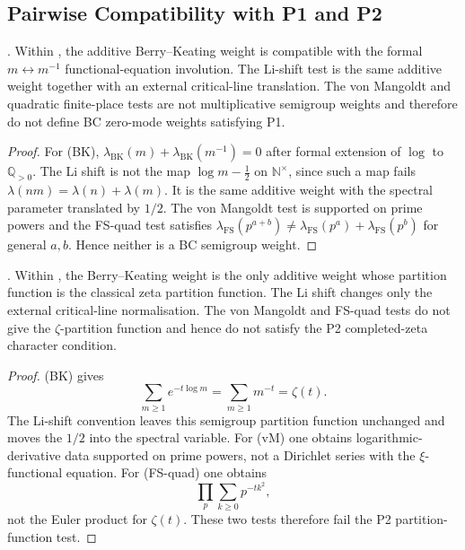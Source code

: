 \subsection{Pairwise Compatibility with P1 and P2}
\label{v4-arith:hpar-det:compat-P1-P2}

\begin{lemma}
\label{v4-arith:hpar-det:lem:P1-compat}
\ClaimStatusProvedHere. Within
, the additive
Berry--Keating weight is compatible with the formal
\(m\leftrightarrow m^{-1}\) functional-equation involution. The
Li-shift test is the same additive weight together with an external
critical-line translation. The von Mangoldt and quadratic finite-place
tests are not multiplicative semigroup weights and therefore do
not define BC zero-mode weights satisfying P1.
\end{lemma}

\begin{proof}
For (BK),
\(\lambda_{\mathrm{BK}}(m)+\lambda_{\mathrm{BK}}(m^{-1})=0\) after
formal extension of \(\log\) to \(\mathbb{Q}_{>0}\). The Li shift is not the map
\(\log m-\frac12\) on \(\mathbb{N}^{\times}\), since such a map fails
\(\lambda(nm)=\lambda(n)+\lambda(m)\). It is the same additive weight
with the spectral parameter translated by \(1/2\). The von Mangoldt
test is supported on prime powers and the FS-quad test satisfies
\(\lambda_{\mathrm{FS}}(p^{a+b})\ne
\lambda_{\mathrm{FS}}(p^{a})+\lambda_{\mathrm{FS}}(p^{b})\) for
general \(a,b\). Hence neither is a BC semigroup weight.
\end{proof}

\begin{lemma}
\label{v4-arith:hpar-det:lem:P2-compat}
\ClaimStatusProvedHere. Within
, the Berry--Keating
weight is the only additive weight whose partition function is the
classical zeta partition function. The Li shift changes only the
external critical-line normalisation. The von Mangoldt and FS-quad
tests do not give the \(\zeta\)-partition function and hence do not
satisfy the P2 completed-zeta character condition.
\end{lemma}

\begin{proof}
(BK) gives
\[
 \sum_{m\geq 1}e^{-t\log m}=\sum_{m\geq 1}m^{-t}=\zeta(t).
\]
The Li-shift convention leaves this semigroup partition function
unchanged and moves the \(1/2\) into the spectral variable. For (vM)
one obtains logarithmic-derivative data supported on prime
powers, not a Dirichlet series with the \(\xi\)-functional equation.
For (FS-quad) one obtains
\[
 \prod_{p}\sum_{k\geq0}p^{-tk^{2}},
\]
not the Euler product for \(\zeta(t)\). These two tests therefore
fail the P2 partition-function test.
\end{proof}

